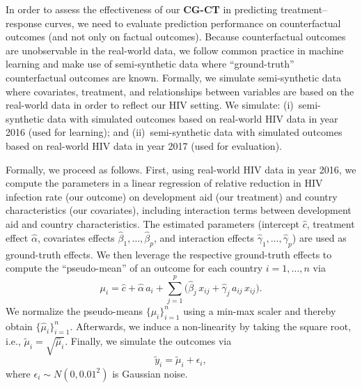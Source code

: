 \documentclass[sigconf]{acmart}
\newcommand{\framework}{\textbf{\mbox{CG-CT}}\xspace}
\begin{document}
In order to assess the effectiveness of our \framework in predicting treatment--response curves, we need to evaluate prediction performance on counterfactual outcomes (and not only on factual outcomes). Because counterfactual outcomes are unobservable in the real-world data, we follow common practice in machine learning \cite{Schwab2020, Bica2020} and make use of semi-synthetic data where ``ground-truth'' counterfactual outcomes are known. Formally, we simulate semi-synthetic data where covariates, treatment, and relationships between variables are based on the real-world data in order to reflect our HIV setting. We simulate: (i)~semi-synthetic data with simulated outcomes based on real-world HIV data in year 2016 (used for learning); and (ii)~semi-synthetic data with simulated outcomes based on real-world HIV data in year 2017 (used for evaluation).

Formally, we proceed as follows. First, using real-world HIV data in year 2016, we compute the parameters in a linear regression of relative reduction in HIV infection rate (our outcome) on development aid (our treatment) and country characteristics (our covariates), including interaction terms between development aid and country characteristics. The estimated parameters (intercept $\hat{c}$, treatment effect $\hat{\alpha}$, covariates effects $\hat{\beta}_1, \ldots, \hat{\beta}_p $, and interaction effects $\hat{\gamma}_1, \ldots, \hat{\gamma}_p $) are used as ground-truth effects. We then leverage the respective ground-truth effects to compute the ``pseudo-mean'' of an outcome for each country $i=1, \ldots, n$ via 
\begin{equation}
\label{eq:gt_efffect}
    \mu_i = \hat{c} + \hat{\alpha} \, a_i +  \sum_{j=1}^p \big( \hat{\beta}_j \, x_{ij} + \hat{\gamma}_j \, a_{ij} \,  x_{ij} \big) .
\end{equation}
We normalize the pseudo-means $\{ \mu_i \}_{i=1}^n$ using a min-max scaler and thereby obtain $ \{ \hat{\mu}_i  \}_{i=1}^n $. Afterwards, we induce a non-linearity by taking the square root, i.e., $\tilde{\mu}_i = \sqrt{\hat{\mu}_i}$. Finally, we simulate the outcomes via  
\begin{equation}
    \tilde{y}_i = \tilde{\mu}_i + \epsilon_i ,
\end{equation}
where $\epsilon_i \sim N(0, 0.01^2)$ is Gaussian noise. 
\end{document}

